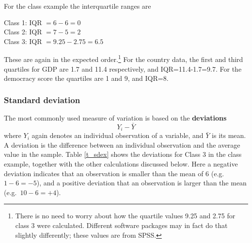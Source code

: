 For the class example the interquartile ranges are

Class 1: IQR $= 6-6 =0$\\
Class 2: IQR $= 7-5 =2$\\
Class 3: IQR $= 9.25-2.75 =6.5$

These are again in the expected order.\footnote{There is no need to
worry about how the quartile values 9.25 and 2.75 for class 3 were
calculated. Different software packages may in fact do that slightly
differently; these values are from SPSS.} For the country data, the
first and third quartiles for GDP are 1.7 and 11.4 respectively, and
IQR=11.4-1.7=9.7. For the democracy score the quartiles are 1 and 9, and
IQR=8.

\subsubsection{Standard deviation}

The most commonly used measure of variation is based on the
\textbf{deviations}
\[
Y_{i}-\bar{Y}
\]
where $Y_{i}$ again denotes an individual observation of a variable, and
$\bar{Y}$ is its mean. A deviation is the difference between
an individual observation and the average value in the sample. Table \ref{t_sdex} shows the
deviations for Class 3 in the class example, together with the other
calculations discussed below. Here a negative deviation
indicates that an observation is smaller than the mean of 6 (e.g.\
$1-6=-5$), and a positive deviation that an observation is larger than
the mean (e.g.\ $10-6=+4$).

